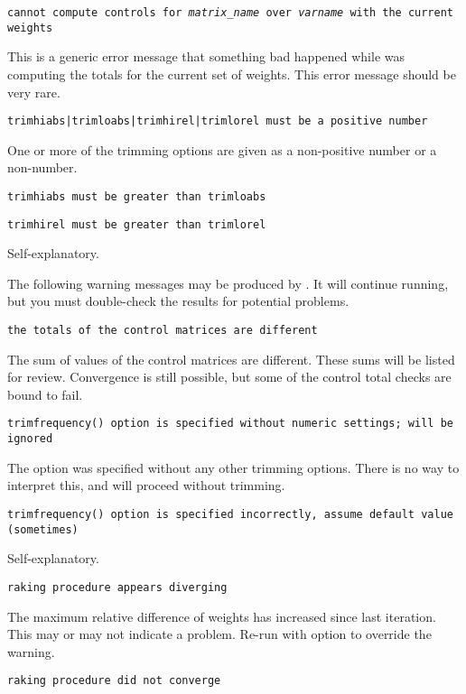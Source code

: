     \noindent
    {\tt cannot compute controls for {\it matrix{\_}name} over
    {\it varname} with the current weights}

    \morehang
    This is a generic error message that something bad happened while
     was computing the totals for the current set of weights.
    This error message should be very rare.
    
    \noindent
    {\tt trimhiabs|trimloabs|trimhirel|trimlorel must be a positive number}
    
    \morehang
    One or more of the trimming options are given as a non-positive number
    or a non-number.
    
    \noindent
    {\tt trimhiabs must be greater than trimloabs}
    
    \noindent
    {\tt trimhirel must be greater than trimlorel}
    
    \morehang
    Self-explanatory.

The following warning messages may be produced by
. It will continue running, but you must
double-check the results for potential problems.

\noindent
    {\tt the totals of the control matrices are different}

    \morehang
    The sum of values of the control matrices are different.
    These sums will be listed for review. Convergence is still
    possible, but some of the control total checks are bound to fail.

    \noindent
    {\tt trimfrequency() option is specified without numeric settings; will be ignored}

    \morehang
    The option  was specified without any other trimming options.
    There is no way to interpret this, and  will proceed without
    trimming.

    \noindent
    {\tt trimfrequency() option is specified incorrectly, assume default value (sometimes)}

    \morehang
    Self-explanatory.

    \noindent
    {\tt raking procedure appears diverging}

    \morehang
    The maximum relative difference of weights has increased since last
    iteration. This may or may not indicate a problem. Re-run 
    with  option to override the warning.

    \noindent
    {\tt raking procedure did not converge}

